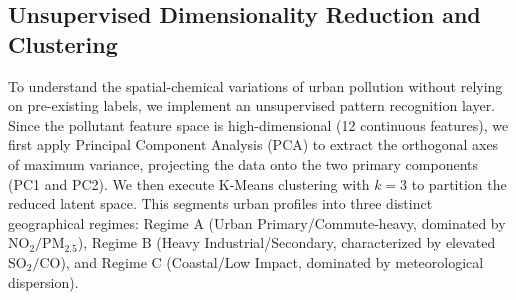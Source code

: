 \documentclass[conference]{IEEEtran}
\begin{document}
\subsection{Unsupervised Dimensionality Reduction and Clustering}
To understand the spatial-chemical variations of urban pollution without relying on pre-existing labels, we implement an unsupervised pattern recognition layer. Since the pollutant feature space is high-dimensional (12 continuous features), we first apply Principal Component Analysis (PCA) to extract the orthogonal axes of maximum variance, projecting the data onto the two primary components (PC1 and PC2). We then execute K-Means clustering with $k=3$ to partition the reduced latent space. This segments urban profiles into three distinct geographical regimes: Regime A (Urban Primary/Commute-heavy, dominated by $\text{NO}_2/\text{PM}_{2.5}$), Regime B (Heavy Industrial/Secondary, characterized by elevated $\text{SO}_2/\text{CO}$), and Regime C (Coastal/Low Impact, dominated by meteorological dispersion).
\end{document}
